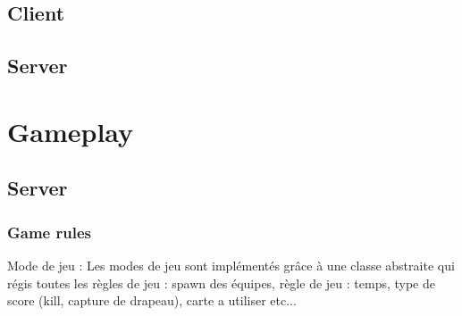 \documentclass{scrreprt}
\begin{document}
\subsection{Client}
\subsection{Server}

\section{Gameplay}
\subsection{Server}
\subsubsection{Game rules}
Mode de jeu :
Les modes de jeu sont implémentés grâce à une classe abstraite qui régis toutes les règles de jeu : spawn des équipes, règle de jeu : temps, type de score (kill, capture de drapeau), carte a utiliser etc...
\end{document}
